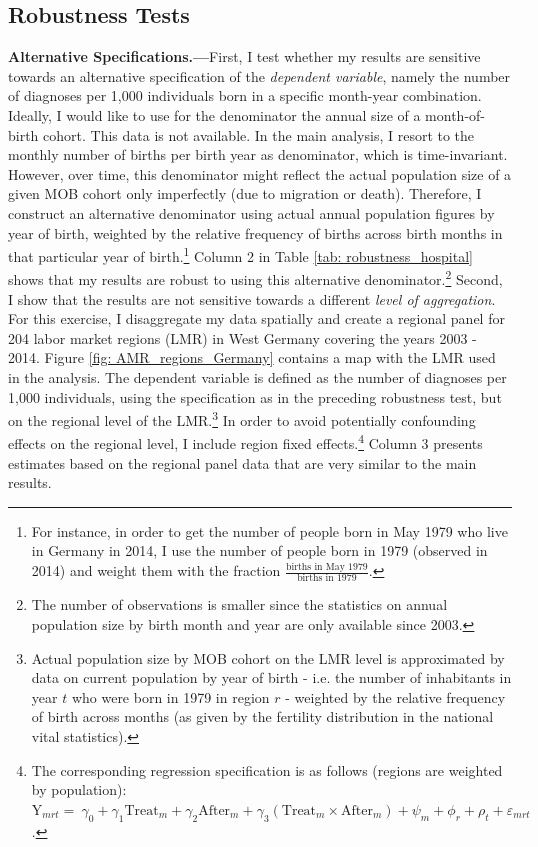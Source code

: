 \documentclass[11pt, a4paper,draft]{article} %
\begin{document}
\bigskip
\subsection{Robustness Tests}\label{sec: robustness}


\textbf{Alternative Specifications.---}First, I test whether my results are sensitive towards an alternative specification of the \textit{dependent variable}, namely the number of diagnoses per 1,000 individuals born in a specific month-year combination. Ideally, I would like to use for the denominator the annual size of a month-of-birth cohort. This data is not available. In the main analysis, I resort to the monthly number of births per birth year as denominator, which is time-invariant. However, over time, this denominator might reflect the actual population size of a given MOB cohort only imperfectly (due to migration or death). Therefore, I construct an alternative denominator using actual annual population figures by year of birth, weighted by the relative frequency of births across birth months in that particular year of birth.\footnote{For instance, in order to get the number of people born in May 1979 who live in Germany in 2014, I use the number of people born in 1979 (observed in 2014) and weight them with the fraction $\frac{\text{births in May 1979}}{\text{births in 1979}}$.} Column 2 in Table \ref{tab: robustness_hospital} shows that my results are robust to using this alternative denominator.\footnote{The number of observations is smaller since the statistics on annual population size by birth month and year are only available since 2003.} Second, I show that the results are not sensitive towards a different \textit{level of aggregation}. For this exercise, I disaggregate my data spatially and create a regional panel for 204 labor market regions (LMR) in West Germany covering the years 2003 - 2014. Figure \ref{fig: AMR_regions_Germany} contains a map with the LMR used in the analysis. The dependent variable is defined as the number of diagnoses per 1,000 individuals, using the specification as in the preceding robustness test, but on the regional level of the LMR.\footnote{Actual population size by MOB cohort on the LMR level is approximated by data on current population by year of birth - i.e. the number of inhabitants in year $t$ who were born in 1979 in region $r$ - weighted by the relative frequency of birth across months (as given by the fertility distribution in the national vital statistics).} In order to avoid potentially confounding effects on the regional level, I include region fixed effects.\footnote{The corresponding regression specification is as follows (regions are weighted by population):\newline $\text{Y}_{mrt} =\ \gamma_0 + \gamma_1 \text{Treat}_{m} + \gamma_2 \text{After}_{m} + \gamma_3 (\text{Treat}_{m} \times \text{After}_{m}) + \psi_m + \phi_r + \rho_t + \varepsilon_{mrt} \label{eq:DD_LMR}$.} Column 3 presents estimates based on the regional panel data that are very similar to the main results. \newline
\end{document}
